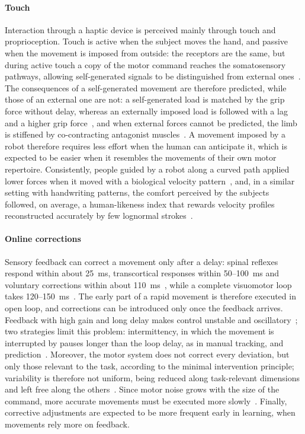 \documentclass[12pt]{report}
\begin{document}
\paragraph{Touch}
Interaction through a haptic device is perceived mainly through touch and proprioception. Touch is active when the subject moves the hand, and passive when the movement is imposed from outside: the receptors are the same, but during active touch a copy of the motor command reaches the somatosensory pathways, allowing self-generated signals to be distinguished from external ones~\cite[pp.~436, 464]{gardner2021touch}. The consequences of a self-generated movement are therefore predicted, while those of an external one are not: a self-generated load is matched by the grip force without delay, whereas an externally imposed load is followed with a lag and a higher grip force~\cite[pp.~723--724]{wolpert2021}, and when external forces cannot be predicted, the limb is stiffened by co-contracting antagonist muscles~\cite[pp.~716, 730]{wolpert2021}. A movement imposed by a robot therefore requires less effort when the human can anticipate it, which is expected to be easier when it resembles the movements of their own motor repertoire. Consistently, people guided by a robot along a curved path applied lower forces when it moved with a biological velocity pattern~\cite{maurice2018}, and, in a similar setting with handwriting patterns, the comfort perceived by the subjects followed, on average, a human-likeness index that rewards velocity profiles reconstructed accurately by few lognormal strokes~\cite{coccaro}.

\paragraph{Online corrections}
Sensory feedback can correct a movement only after a delay: spinal reflexes respond within about 25~ms, transcortical responses within 50--100~ms and voluntary corrections within about 110~ms~\cites[p.~716]{wolpert2021}[p.~852]{scott2021}, while a complete visuomotor loop takes 120--150~ms~\cite[p.~717]{wolpert2021}. The early part of a rapid movement is therefore executed in open loop, and corrections can be introduced only once the feedback arrives. Feedback with high gain and long delay makes control unstable and oscillatory~\cite[p.~720]{wolpert2021}; two strategies limit this problem: intermittency, in which the movement is interrupted by pauses longer than the loop delay, as in manual tracking, and prediction~\cite[p.~723]{wolpert2021}. Moreover, the motor system does not correct every deviation, but only those relevant to the task, according to the minimal intervention principle; variability is therefore not uniform, being reduced along task-relevant dimensions and left free along the others~\cite[pp.~728--729]{wolpert2021}. Since motor noise grows with the size of the command, more accurate movements must be executed more slowly~\cite[pp.~727--728]{wolpert2021}. Finally, corrective adjustments are expected to be more frequent early in learning, when movements rely more on feedback.
\end{document}
